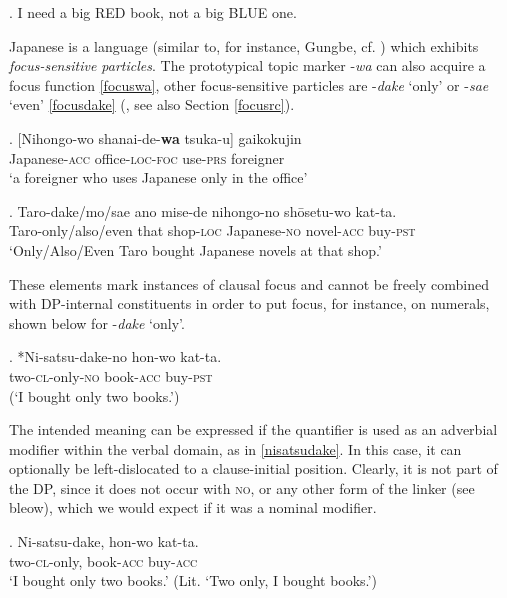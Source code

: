 \ex. I need a big RED book, not a big BLUE one.

Japanese is a language (similar to, for instance,  Gungbe, cf. \citealt{aboh:2004:topic}) which exhibits \textit{focus-sensitive particles}. The prototypical topic marker -\textit{wa} can also acquire a focus function \ref{focuswa}, other focus-sensitive particles are -\textit{dake} `only' or -\textit{sae} `even’ \ref{focusdake} (\citealt{tomioka:2009:contrastive, tomioka:2016:infor, vermeulen:2007:jap, vermeulen:2012:info}, see also Section \ref{focusrc}).

\exg. [Nihongo-wo shanai-de-\textbf{wa} tsuka-u] gaikokujin\\
Japanese-\textsc{acc} office-\textsc{loc}-\textsc{foc} use-\textsc{prs} foreigner\\
`a foreigner who uses Japanese only in the office’ \\ \null \hfill \citep[93]{akaso:2011:on} \label{focuswa}

\exg. Taro-dake/mo/sae ano mise-de nihongo-no shōsetu-wo kat-ta.\\
Taro-only/also/even that shop-\textsc{loc} Japanese-\textsc{no} novel-\textsc{acc} buy-\textsc{pst}\\
`Only/Also/Even Taro bought Japanese novels at that shop.'  \\ \null \hfill \citep[195]{vermeulen:2012:info} \label{focusdake}

These elements mark instances of clausal focus and cannot be freely combined with DP-internal constituents in order to put focus, for instance, on numerals, shown below for -\textit{dake} `only’.

\exg. *Ni-satsu-dake-no hon-wo kat-ta. \label{futatsu}\\
two-\textsc{cl}-only-\textsc{no} book-\textsc{acc} buy-\textsc{pst}\\
(`I bought only two books.’)

The intended meaning can be expressed if the quantifier is used as an adverbial modifier within the verbal domain, as in \ref{nisatsudake}. In this case, it can optionally be left-dislocated to a clause-initial position. Clearly, it is not part of the DP, since it does not occur with \textsc{no}, or any other form of the linker (see bleow), which we would expect if it was a nominal modifier.

\exg. Ni-satsu-dake, hon-wo kat-ta.\\
two-\textsc{cl}-only, book-\textsc{acc} buy-\textsc{acc}\\
`I bought only two books.’ (Lit. `Two only, I bought books.’) \label{nisatsudake}


